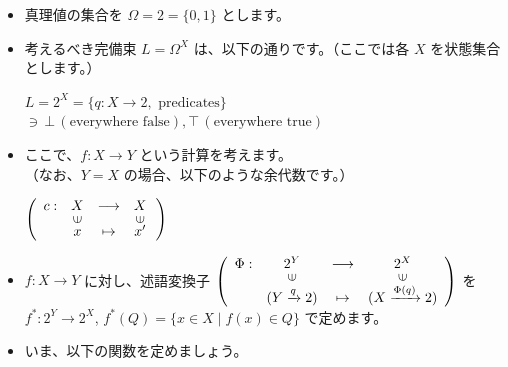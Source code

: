 \documentclass[
		head_space=20mm,
		foot_space=20mm,
		gutter=10mm,
		line_length=190mm
]{jlreq}
\begin{document}
\begin{itemize}
	\item 真理値の集合を $\Omega=2=\{0,1\}$ とします。
	\item 考えるべき完備束 $L=\Omega^X$ は、以下の通りです。（ここでは各 $X$ を状態集合とします。）\begin{center}$L=2^X=\{q:X\to 2,\textrm{ predicates}\}$\\\qquad\qquad$\ni\,\bot \,(\textrm{everywhere false}),\top\,(\textrm{everywhere true})$ \end{center}
	\item ここで、$f:X\to Y$ という計算を考えます。 \\ （なお、$Y=X$ の場合、以下のような余代数です。）\vspace{5pt}
	\begin{center}
			$\left(\begin{array}{cccc} c:&X & \longrightarrow & X\\[-2pt] &\rotatebox{90}{$\in$} & & \rotatebox{90}{$\in$}\\[-4pt] & x & \mapsto & x' \end{array}\,\right)$
		\qquad\quad 
		\begin{small}
		\end{small}
	\end{center} \vspace{3pt}
	\item $f:X\to Y$ に対し、述語変換子 $\left(\begin{array}{cccc}\Phi:&2^Y&\longrightarrow & 2^X\\[-2pt]&\rotatebox{90}{$\in$}&&\rotatebox{90}{$\in$}\\[-2pt] & (Y\xrightarrow{q}2)&\mapsto & (X\xrightarrow{\Phi(q)}2) \end{array}\right)$ を \vspace{10pt} \\ $f^\ast:2^Y\to 2^X$, $f^\ast(Q)=\{x\in X\mid f(x)\in Q\}$ で定めます。\vspace{5pt}
	\item いま、以下の関数を定めましょう。\vspace{3pt}\\ 

\end{itemize}
\end{document}
